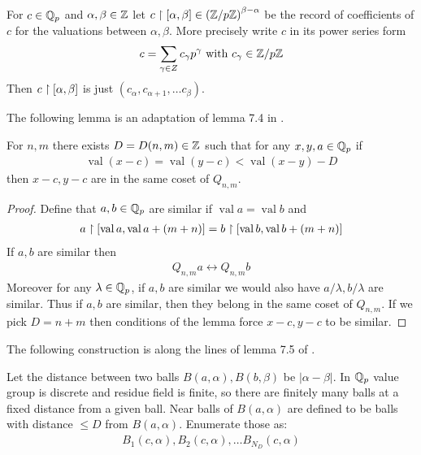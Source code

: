 \documentclass{amsart}
\newcommand{\paren}[1]{\left(#1\right)}
\DeclareMathOperator{\val}{val}
\begin{document}
\begin{Definition}
	For $c \in \mathbb{Q}_p$ and $\alpha, \beta \in \mathbb{Z}$ let $c \midr [\alpha, \beta] \in \paren{\Z/p\Z}^{\beta - \alpha}$ be the record of coefficients of $c$ for the valuations between $\alpha, \beta$.
	More precisely write $c$ in its power series form
	\begin{align*}
		c = \sum_{\gamma \in Z} c_\gamma p^\gamma \text{ with } c_\gamma \in \mathbb{Z}/p\mathbb{Z}
	\end{align*}
	Then $c \upharpoonright [\alpha, \beta]$ is just $(c_\alpha, c_{\alpha+1}, \ldots c_\beta)$.
\end{Definition}

The following lemma is an adaptation of lemma 7.4 in \cite{density}.

\begin{Lemma} \label{distance}
	For $n,m$ there exists $D = D(n,m) \in \mathbb{Z}$ such that for any $x,y,a \in \mathbb{Q}_p$ if
	\begin{align*}
		\val (x - c) = \val (y - c) < \val (x - y) - D
	\end{align*}
	then $x - c, y - c$ are in the same coset of $Q_{n,m}$.
\end{Lemma}
\begin{proof}
	Define that $a,b \in \mathbb{Q}_p$ are similar if $\val a = \val b$ and
	\begin{align*}
		a \midr [\val a, \val a + (m + n)] = b \midr [\val b, \val b + (m + n)]
	\end{align*}
	If $a,b$ are similar then
	\begin{align*}
		Q_{n,m} a \leftrightarrow Q_{n,m} b
	\end{align*}
	Moreover for any $\lambda \in \mathbb{Q}_p$, if $a,b$ are similar we would also have $a/\lambda, b/\lambda$ are similar.
	Thus if $a,b$ are similar, then they belong in the same coset of $Q_{n,m}$.
	If we pick $D = n + m$ then conditions of the lemma force $x - c, y - c$ to be similar.
\end{proof} 

The following construction is along the lines of lemma 7.5 of \cite{density}.

\begin{Definition}
	Let the distance between two balls $B(a, \alpha), B(b, \beta)$ be $|\alpha - \beta|$.
	In $\mathbb{Q}_p$ value group is discrete and residue field is finite, so there are finitely many balls at a fixed distance from a given ball.
	Near balls of $B(a, \alpha)$ are defined to be balls with distance $\leq D$ from $B(a, \alpha)$.
	Enumerate those as:
	\begin{align*}
		B_1(c, \alpha), B_2(c, \alpha), \ldots B_{N_D}(c, \alpha)
	\end{align*}
\end{Definition}
\end{document}
